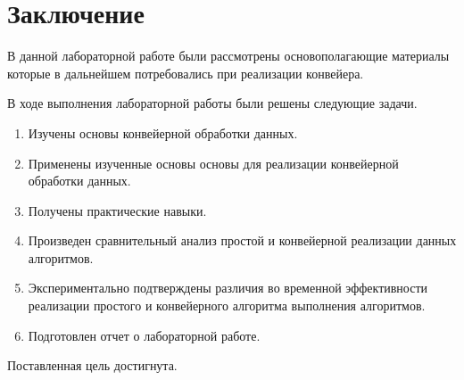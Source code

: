 \chapter*{Заключение}

В данной лабораторной работе были рассмотрены основополагающие материалы которые в дальнейшем потребовались при реализации конвейера. 


В ходе выполнения лабораторной работы были решены следующие задачи.

\begin{enumerate}
	\item Изучены основы конвейерной обработки данных.
	\item Применены изученные основы основы для реализации конвейерной обработки данных.
	
	\item Получены практические навыки.
	\item Произведен сравнительный анализ простой и конвейерной реализации данных алгоритмов.
	\item Экспериментально подтверждены различия во временной эффективности реализации простого и конвейерного алгоритма выполнения алгоритмов.
	
	\item Подготовлен отчет о лабораторной работе.
\end{enumerate}

Поставленная цель достигнута.

